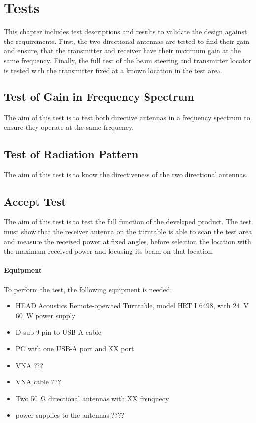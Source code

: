 \chapter{Tests}
This chapter includes test descriptions and results to validate the design against the requirements. First, the two directional antennas are tested to find their gain and ensure, that the transmitter and receiver have their maximum gain at the same frequency. Finally, the full test of the beam steering and transmitter locator is tested with the transmitter fixed at a known location in the test area.

\section{Test of Gain in Frequency Spectrum} 
The aim of this test is to test both directive antennas in a frequency spectrum to ensure they operate at the same frequency.

\section{Test of Radiation Pattern}
The aim of this test is to know the directiveness of the two directional antennas.

\section{Accept Test}
The aim of this test is to test the full function of the developed product. The test must show that the receiver antenna on the turntable is able to scan the test area and measure the received power at fixed angles, before selection the location with the maximum received power and focusing its beam on that location.

\subsubsection{Equipment}
To perform the test, the following equipment is needed:

\begin{itemize}
    \item HEAD Acoustics Remote-operated Turntable, model HRT I 6498, with \SI{24}{\volt} \SI{60}{W} power supply
    \item D-sub 9-pin to USB-A cable
    \item PC with one USB-A port and XX port
    \item VNA ???
    \item VNA cable ???
    \item Two \SI{50}{\ohm} directional antennas with XX frenquecy
    \item power supplies to the antennas ????
\end{itemize}

